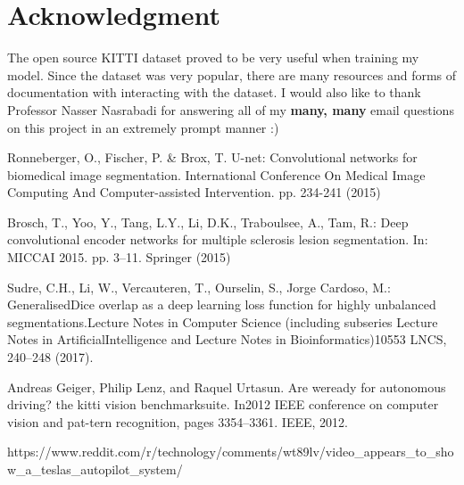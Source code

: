 \documentclass[Location Location Location! : Exploring Image Segmentation Problem In Urban Driving Scenarios]{IEEEtran}
\begin{document}
\section*{Acknowledgment}
The open source KITTI \cite{kitti} dataset proved to be very useful when training my model. Since the dataset was very popular, there are many resources and forms of documentation with interacting with the dataset. I would also like to thank Professor Nasser Nasrabadi for answering all of my \textbf{many, many}  email questions on this project in an extremely prompt manner :) 

\begin{thebibliography}{00}
 Ronneberger, O., Fischer, P. & Brox, T. U-net: Convolutional networks for biomedical image segmentation. International  Conference  On  Medical  Image  Computing And  Computer-assisted  Intervention.  pp.  234-241 (2015)

 Brosch, T., Yoo, Y., Tang, L.Y., Li, D.K., Traboulsee, A., Tam, R.: Deep convolutional encoder networks for multiple sclerosis lesion segmentation. In: MICCAI
2015. pp. 3–11. Springer (2015)

 Sudre, C.H., Li, W., Vercauteren, T., Ourselin, S., Jorge Cardoso, M.: GeneralisedDice overlap as a deep learning loss function for highly unbalanced segmentations.Lecture Notes in Computer Science (including subseries Lecture Notes in ArtificialIntelligence and Lecture Notes in Bioinformatics)10553 LNCS, 240–248 (2017).

 Andreas Geiger, Philip Lenz, and Raquel Urtasun.  Are weready for autonomous driving?   the kitti vision benchmarksuite. In2012 IEEE conference on computer vision and pat-tern recognition, pages 3354–3361. IEEE, 2012.

 https://www.reddit.com/r/technology/comments/wt89lv/video_appears_to_show_a_teslas_autopilot_system/



\end{thebibliography}
\vspace{12pt}
\end{document}
